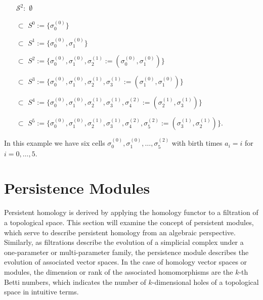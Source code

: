 \begin{example}{\cite[\S 2.2, Example]{de2011dualities}}
	\begin{itemize}
		\item[$\mathcal{S}^{2}:$] $\emptyset$
		\item[$\subset$] $S^{0} := \{\sigma_{0}^{(0)}\}$
		\item[$\subset$] $S^{1} := \{\sigma_{0}^{(0)}, \sigma_{1}^{(0)}\}$
		\item[$\subset$] $S^{2} := \{\sigma_{0}^{(0)}, \sigma_{1}^{(0)}, \sigma_{2}^{(1)} := (\sigma_{0}^{(0)}, \sigma_{1}^{(0)})\}$
		\item[$\subset$] $S^{3} := \{\sigma_{0}^{(0)}, \sigma_{1}^{(0)}, \sigma_{2}^{(1)}, \sigma_{3}^{(1)} := (\sigma_{1}^{(0)}, \sigma_{1}^{(0)})\}$
		\item[$\subset$] $S^{4} := \{\sigma_{0}^{(0)}, \sigma_{1}^{(0)}, \sigma_{2}^{(1)}, \sigma_{3}^{(1)}, \sigma_{4}^{(2)} := (\sigma_{2}^{(1)}, \sigma_{3}^{(1)})\}$
		\item[$\subset$] $S^{5} := \{\sigma_{0}^{(0)}, \sigma_{1}^{(0)}, \sigma_{2}^{(1)}, \sigma_{3}^{(1)}, \sigma_{4}^{(2)}, \sigma_{5}^{(2)} := (\sigma_{3}^{(1)}, \sigma_{2}^{(1)})\}.$
	\end{itemize}
	In this example we have six cells $\sigma_0^{(0)}, \sigma_1^{(0)}, \ldots, \sigma_5^{(2)}$ with birth times $a_i = i$ for $i = 0, \ldots, 5$.
\end{example}
\vspace{0.2cm}

\section{Persistence Modules}
\label{PersistenceModules}
Persistent homology is derived by applying the homology functor to a filtration of a topological space. This section will examine the concept of persistent modules, which serve to describe persistent homology from an algebraic perspective. Similarly, as filtrations describe the evolution of a simplicial complex under a one-parameter or multi-parameter family, the persistence module describes the evolution of associated vector spaces. In the case of homology vector spaces or modules, the dimension or rank of the associated homomorphisms are the $k$-th Betti numbers, which indicates the number of $k$-dimensional holes of a topological space in intuitive terms.

